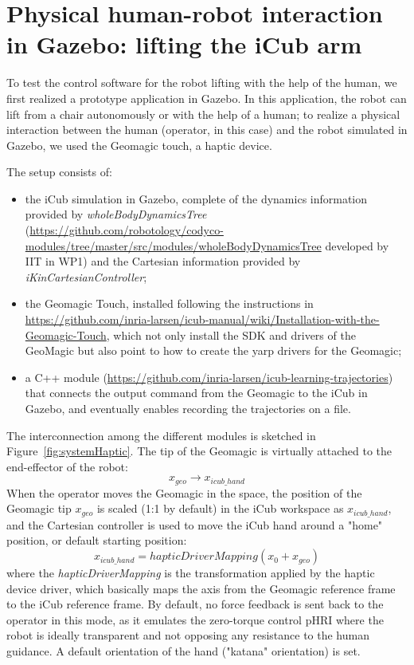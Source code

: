

\section{Physical human-robot interaction in Gazebo: lifting the iCub arm}

To test the control software for the robot lifting with the help of the human, we first realized a prototype application in Gazebo. In this application, the robot can lift from a chair autonomously or with the help of a human; to realize a physical interaction between the human (operator, in this case) and the robot simulated in Gazebo, we used the Geomagic touch, a haptic device.

The setup consists of:
\begin{itemize}
\item the iCub simulation in Gazebo, complete of the dynamics information provided by \textit{wholeBodyDynamicsTree} (\url{https://github.com/robotology/codyco-modules/tree/master/src/modules/wholeBodyDynamicsTree} developed by IIT in WP1) and the Cartesian information provided by \textit{iKinCartesianController};
\item the Geomagic Touch, installed following the instructions in \url{https://github.com/inria-larsen/icub-manual/wiki/Installation-with-the-Geomagic-Touch}, which not only install the SDK and drivers of the GeoMagic but also point to how to create the yarp drivers for the Geomagic;
\item a C++ module (\url{https://github.com/inria-larsen/icub-learning-trajectories}) that connects the output command from the Geomagic to the iCub in Gazebo, and eventually enables recording the trajectories on a file.
\end{itemize}

The interconnection among the different modules is sketched in Figure~\ref{fig:systemHaptic}.
The tip of the Geomagic is virtually attached to the end-effector of the robot:
$$ x_{geo} \rightarrow x_{icub\_hand} $$
When the operator moves the Geomagic in the space, the position of the Geomagic tip $x_{geo}$ is scaled (1:1 by default) in the iCub workspace as $x_{icub\_hand}$, and the Cartesian controller is used to move the iCub hand around a "home" position, or default starting position:
$$ x_{icub\_hand} = hapticDriverMapping(x_0 + x_{geo})$$
where the \textit{hapticDriverMapping} is the transformation applied by the haptic device driver, which basically maps the axis from the Geomagic reference frame to the iCub reference frame.
By default, no force feedback is sent back to the operator in this mode, as it emulates the zero-torque control pHRI where the robot is ideally transparent and not opposing any resistance to the human guidance. A default orientation of the hand ("katana" orientation) is set.

